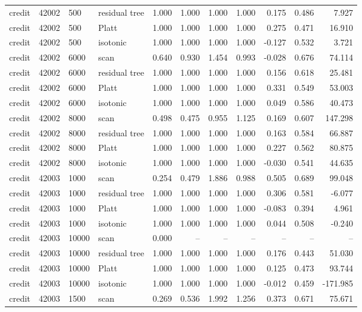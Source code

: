 \begin{tabular}{lrllrrrrrrr}
credit & 42002 & 500 & residual tree & 1.000 & 1.000 & 1.000 & 1.000 & 0.175 & 0.486 & 7.927 \\
credit & 42002 & 500 & Platt & 1.000 & 1.000 & 1.000 & 1.000 & 0.275 & 0.471 & 16.910 \\
credit & 42002 & 500 & isotonic & 1.000 & 1.000 & 1.000 & 1.000 & -0.127 & 0.532 & 3.721 \\
credit & 42002 & 6000 & scan & 0.640 & 0.930 & 1.454 & 0.993 & -0.028 & 0.676 & 74.114 \\
credit & 42002 & 6000 & residual tree & 1.000 & 1.000 & 1.000 & 1.000 & 0.156 & 0.618 & 25.481 \\
credit & 42002 & 6000 & Platt & 1.000 & 1.000 & 1.000 & 1.000 & 0.331 & 0.549 & 53.003 \\
credit & 42002 & 6000 & isotonic & 1.000 & 1.000 & 1.000 & 1.000 & 0.049 & 0.586 & 40.473 \\
credit & 42002 & 8000 & scan & 0.498 & 0.475 & 0.955 & 1.125 & 0.169 & 0.607 & 147.298 \\
credit & 42002 & 8000 & residual tree & 1.000 & 1.000 & 1.000 & 1.000 & 0.163 & 0.584 & 66.887 \\
credit & 42002 & 8000 & Platt & 1.000 & 1.000 & 1.000 & 1.000 & 0.227 & 0.562 & 80.875 \\
credit & 42002 & 8000 & isotonic & 1.000 & 1.000 & 1.000 & 1.000 & -0.030 & 0.541 & 44.635 \\
credit & 42003 & 1000 & scan & 0.254 & 0.479 & 1.886 & 0.988 & 0.505 & 0.689 & 99.048 \\
credit & 42003 & 1000 & residual tree & 1.000 & 1.000 & 1.000 & 1.000 & 0.306 & 0.581 & -6.077 \\
credit & 42003 & 1000 & Platt & 1.000 & 1.000 & 1.000 & 1.000 & -0.083 & 0.394 & 4.961 \\
credit & 42003 & 1000 & isotonic & 1.000 & 1.000 & 1.000 & 1.000 & 0.044 & 0.508 & -0.240 \\
credit & 42003 & 10000 & scan & 0.000 & -- & -- & -- & -- & -- & -- \\
credit & 42003 & 10000 & residual tree & 1.000 & 1.000 & 1.000 & 1.000 & 0.176 & 0.443 & 51.030 \\
credit & 42003 & 10000 & Platt & 1.000 & 1.000 & 1.000 & 1.000 & 0.125 & 0.473 & 93.744 \\
credit & 42003 & 10000 & isotonic & 1.000 & 1.000 & 1.000 & 1.000 & -0.012 & 0.459 & -171.985 \\
credit & 42003 & 1500 & scan & 0.269 & 0.536 & 1.992 & 1.256 & 0.373 & 0.671 & 75.671 \\

\end{tabular}
